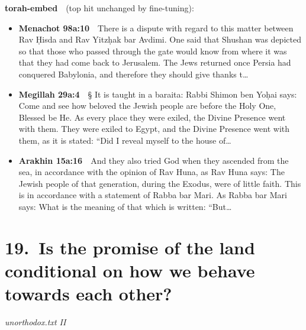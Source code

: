 \documentclass[11pt,a4paper]{article}
\begin{document}
{\color{quiet}\small\textbf{torah-embed}\ \ (top hit unchanged by fine-tuning):}
\begin{itemize}[leftmargin=1.2em,itemsep=3pt]
\item {\color{ref}\textbf{Menachot 98a:10}}\ \ There is a dispute with regard to this matter between Rav Ḥisda and Rav Yitzḥak bar Avdimi. One said that Shushan was depicted so that those who passed through the gate would know from where it was that they had come back to Jerusalem. The Jews returned once Persia had conquered Babylonia, and therefore they should give thanks t\ldots
\item {\color{ref}\textbf{Megillah 29a:4}}\ \ § It is taught in a baraita: Rabbi Shimon ben Yoḥai says: Come and see how beloved the Jewish people are before the Holy One, Blessed be He. As every place they were exiled, the Divine Presence went with them. They were exiled to Egypt, and the Divine Presence went with them, as it is stated: “Did I reveal myself to the house of\ldots
\item {\color{ref}\textbf{Arakhin 15a:16}}\ \ And they also tried God when they ascended from the sea, in accordance with the opinion of Rav Huna, as Rav Huna says: The Jewish people of that generation, during the Exodus, were of little faith. This is in accordance with a statement of Rabba bar Mari. As Rabba bar Mari says: What is the meaning of that which is written: “But\ldots
\end{itemize}

\section*{19.\ Is the promise of the land conditional on how we behave towards each other?}
{\color{quiet}\small\textit{unorthodox.txt II}}
\end{document}
